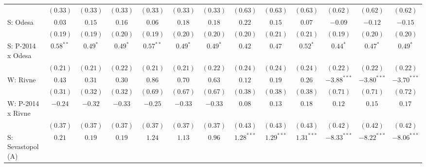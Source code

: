 \begin{table}
\begin{center}
\begin{tiny}
\begin{tabular}{l c c c c c c c c c c c c}
                            & $(0.33)$      & $(0.33)$      & $(0.33)$      & $(0.33)$     & $(0.33)$     & $(0.33)$     & $(0.63)$      & $(0.63)$      & $(0.63)$       & $(0.62)$      & $(0.62)$      & $(0.62)$      \\
S: Odesa                    & $0.03$        & $0.15$        & $0.16$        & $0.06$       & $0.18$       & $0.18$       & $0.22$        & $0.15$        & $0.07$         & $-0.09$       & $-0.12$       & $-0.15$       \\
                            & $(0.19)$      & $(0.19)$      & $(0.20)$      & $(0.19)$     & $(0.20)$     & $(0.20)$     & $(0.20)$      & $(0.21)$      & $(0.21)$       & $(0.19)$      & $(0.20)$      & $(0.20)$      \\
S: P-2014 x Odesa           & $0.58^{**}$   & $0.49^{*}$    & $0.49^{*}$    & $0.57^{**}$  & $0.49^{*}$   & $0.49^{*}$   & $0.42$        & $0.47$        & $0.52^{*}$     & $0.44^{*}$    & $0.47^{*}$    & $0.49^{*}$    \\
                            & $(0.21)$      & $(0.21)$      & $(0.22)$      & $(0.21)$     & $(0.21)$     & $(0.22)$     & $(0.24)$      & $(0.24)$      & $(0.24)$       & $(0.22)$      & $(0.22)$      & $(0.22)$      \\
W: Rivne                    & $0.43$        & $0.31$        & $0.30$        & $0.86$       & $0.70$       & $0.63$       & $0.12$        & $0.19$        & $0.26$         & $-3.88^{***}$ & $-3.80^{***}$ & $-3.70^{***}$ \\
                            & $(0.31)$      & $(0.32)$      & $(0.32)$      & $(0.69)$     & $(0.67)$     & $(0.67)$     & $(0.38)$      & $(0.38)$      & $(0.38)$       & $(0.71)$      & $(0.71)$      & $(0.72)$      \\
W: P-2014 x Rivne           & $-0.24$       & $-0.32$       & $-0.33$       & $-0.25$      & $-0.33$      & $-0.33$      & $0.08$        & $0.13$        & $0.18$         & $0.12$        & $0.15$        & $0.17$        \\
                            & $(0.37)$      & $(0.37)$      & $(0.37)$      & $(0.37)$     & $(0.37)$     & $(0.37)$     & $(0.43)$      & $(0.43)$      & $(0.43)$       & $(0.42)$      & $(0.42)$      & $(0.42)$      \\
S: Sevastopol (A)           & $0.21$        & $0.19$        & $0.19$        & $1.24$       & $1.13$       & $0.96$       & $1.28^{***}$  & $1.29^{***}$  & $1.31^{***}$   & $-8.33^{***}$ & $-8.22^{***}$ & $-8.06^{***}$ \\

\end{tabular}
\end{tiny}
\end{center}
\end{table}
